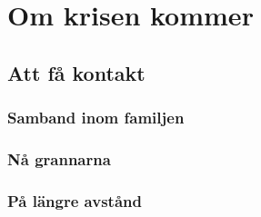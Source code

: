 \section{Om krisen kommer}

\subsection{Att få kontakt}

\subsubsection{Samband inom familjen}

\subsubsection{Nå grannarna}

\subsubsection{På längre avstånd}



